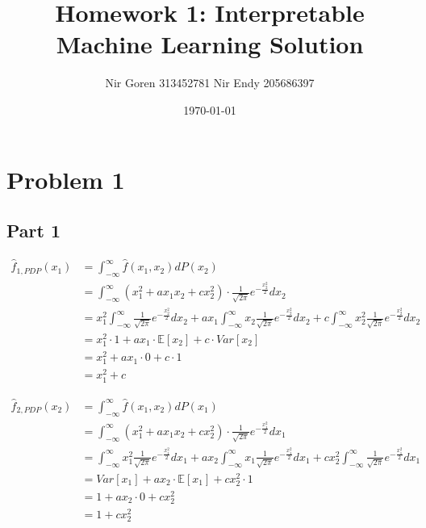 \documentclass{article}
\begin{document}
\title{Homework 1: Interpretable Machine Learning Solution}
\author{Nir Goren 313452781 Nir Endy 205686397}
\date{\today}

\maketitle

\section{Problem 1}
\subsection{Part 1}
\begin{align*}
    \hat{f}_{1,PDP}(x_1) &= \int_{-\infty}^{\infty}\hat{f}(x_1,x_2)dP(x_2) \\
    &= \int_{-\infty}^{\infty}(x_1^2 + ax_1x_2 + cx_2^2) \cdot \frac{1}{\sqrt{2\pi}}e^{-\frac{x_2^2}{2}}dx_2 \\
    &= x_1^2\int_{-\infty}^{\infty}\frac{1}{\sqrt{2\pi}}e^{-\frac{x_2^2}{2}}dx_2 + ax_1\int_{-\infty}^{\infty}x_2\frac{1}{\sqrt{2\pi}}e^{-\frac{x_2^2}{2}}dx_2 + c\int_{-\infty}^{\infty}x_2^2\frac{1}{\sqrt{2\pi}}e^{-\frac{x_2^2}{2}}dx_2 \\ 
    &= x_1^2 \cdot 1 + ax_1\cdot \mathbb{E}[x_2] + c\cdot Var[x_2] \\
    &= x_1^2 + ax_1\cdot 0 + c\cdot 1 \\
    &= x_1^2 + c
\end{align*}

\begin{align*}
    \hat{f}_{2,PDP}(x_2) &= \int_{-\infty}^{\infty}\hat{f}(x_1,x_2)dP(x_1) \\
    &= \int_{-\infty}^{\infty}(x_1^2 + ax_1x_2 + cx_2^2) \cdot \frac{1}{\sqrt{2\pi}}e^{-\frac{x_1^2}{2}}dx_1 \\
    &= \int_{-\infty}^{\infty}x_1^2\frac{1}{\sqrt{2\pi}}e^{-\frac{x_1^2}{2}}dx_1 + ax_2\int_{-\infty}^{\infty}x_1\frac{1}{\sqrt{2\pi}}e^{-\frac{x_1^2}{2}}dx_1 + cx_2^2\int_{-\infty}^{\infty}\frac{1}{\sqrt{2\pi}}e^{-\frac{x_1^2}{2}}dx_1 \\ 
    &= Var[x_1] + ax_2\cdot \mathbb{E}[x_1] + cx_2^2\cdot 1 \\
    &= 1 + ax_2\cdot 0 + cx_2^2 \\
    &= 1 + cx_2^2
\end{align*}
\end{document}
